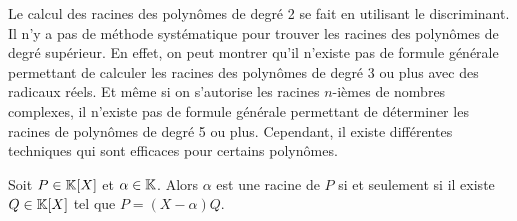 \documentclass{magnolia}
\begin{document}
\begin{remarques}
\remarque Le calcul
des racines des polynômes de degré 2 se fait en utilisant le discriminant.
\remarque Il n'y a pas de méthode
systématique pour trouver les racines des polynômes de degré supérieur. En effet, on peut montrer qu'il
n'existe pas de formule générale permettant de calculer les racines des polynômes de degré 3 ou plus avec
des radicaux réels. Et même si on s'autorise les racines $n$-ièmes de nombres complexes, il n'existe pas
de formule générale permettant de déterminer les racines de polynômes de degré 5 ou plus. Cependant, il
existe différentes techniques qui sont efficaces pour certains polynômes.
\end{remarques}

\begin{proposition}
Soit $P\in\polyK$ et $\alpha\in\mathbb{K}$. Alors $\alpha$ est une racine de $P$ si et seulement si il existe
$Q\in\polyK$ tel que $P=(X-\alpha)Q$.
\end{proposition}
\end{document}
